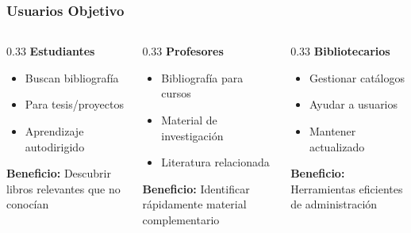 \documentclass[aspectratio=169]{beamer}
\begin{document}
\begin{frame}
\frametitle{Usuarios Objetivo}

\begin{columns}
\begin{column}{0.33\textwidth}
\textbf{Estudiantes}
\begin{itemize}
\item Buscan bibliografía
\item Para tesis/proyectos
\item Aprendizaje autodirigido
\end{itemize}

\vspace{0.3cm}

\textbf{Beneficio:}
Descubrir libros relevantes que no conocían
\end{column}

\begin{column}{0.33\textwidth}
\textbf{Profesores}
\begin{itemize}
\item Bibliografía para cursos
\item Material de investigación
\item Literatura relacionada
\end{itemize}

\vspace{0.3cm}

\textbf{Beneficio:}
Identificar rápidamente material complementario
\end{column}

\begin{column}{0.33\textwidth}
\textbf{Bibliotecarios}
\begin{itemize}
\item Gestionar catálogos
\item Ayudar a usuarios
\item Mantener actualizado
\end{itemize}

\vspace{0.3cm}

\textbf{Beneficio:}
Herramientas eficientes de administración
\end{column}
\end{columns}

\end{frame}
\end{document}
